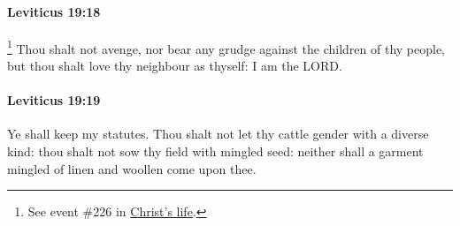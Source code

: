 		\paragraph{Leviticus 19:18} %
			\label{LEVITICUS-19-18}

				\footnote{%
					See event \#226 in \hyperref[LCHRIST]{Christ's life}.
					}%
			Thou shalt not avenge, nor bear any grudge against the children of thy people, but thou shalt love thy neighbour as thyself: I am the LORD.


		\paragraph{Leviticus 19:19} %
			\label{LEVITICUS-19-19}

			Ye shall keep my statutes. Thou shalt not let thy cattle gender with a diverse kind: thou shalt not sow thy field with mingled seed: neither shall a garment mingled of linen and woollen come upon thee.

